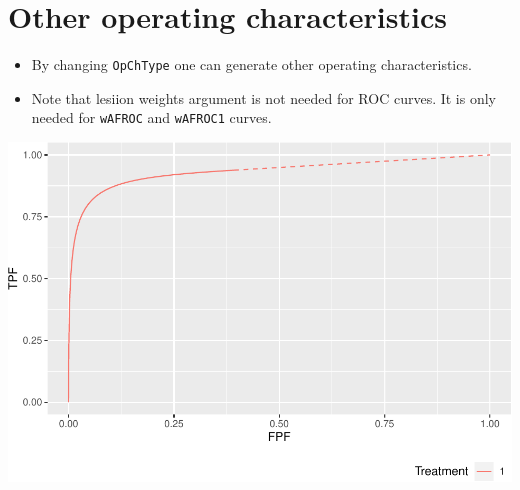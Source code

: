 \documentclass[]{book}
\newenvironment{Shaded}{\begin{snugshade}}{\end{snugshade}}
\newcommand{\DataTypeTok}[1]{\textcolor[rgb]{0.13,0.29,0.53}{#1}}
\newcommand{\DecValTok}[1]{\textcolor[rgb]{0.00,0.00,0.81}{#1}}
\newcommand{\FloatTok}[1]{\textcolor[rgb]{0.00,0.00,0.81}{#1}}
\newcommand{\KeywordTok}[1]{\textcolor[rgb]{0.13,0.29,0.53}{\textbf{#1}}}
\newcommand{\NormalTok}[1]{#1}
\newcommand{\OperatorTok}[1]{\textcolor[rgb]{0.81,0.36,0.00}{\textbf{#1}}}
\newcommand{\StringTok}[1]{\textcolor[rgb]{0.31,0.60,0.02}{#1}}
\providecommand{\tightlist}{%
  \setlength{\itemsep}{0pt}\setlength{\parskip}{0pt}}
\begin{document}
\hypertarget{other-operating-characteristics}{%
\section{Other operating characteristics}\label{other-operating-characteristics}}

\begin{itemize}
\tightlist
\item
  By changing \texttt{OpChType} one can generate other operating characteristics.
\item
  Note that lesiion weights argument is not needed for ROC curves. It is only needed for \texttt{wAFROC} and \texttt{wAFROC1} curves.
\end{itemize}

\begin{Shaded}
\end{Shaded}

\includegraphics{19-PlotRsmOpCh_files/figure-latex/unnamed-chunk-5-1.pdf}
\end{document}
